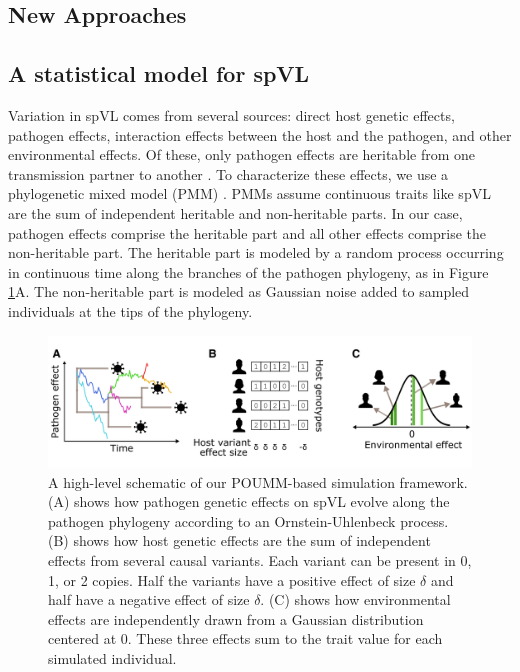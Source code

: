 \documentclass[11pt]{article}
\begin{document}
\begin{linenumbers}
\section*{New Approaches}
\subsection*{A statistical model for spVL}

Variation in spVL comes from several sources: direct host genetic effects, pathogen effects, interaction effects between the host and the pathogen, and other environmental effects. Of these, only pathogen effects are heritable from one transmission partner to another \citep{Leventhal2016}. To characterize these effects, we use a phylogenetic mixed model (PMM) \citep{Housworth2004}. PMMs assume continuous traits like spVL are the sum of independent heritable and non-heritable parts. In our case, pathogen effects comprise the heritable part and all other effects comprise the non-heritable part. The heritable part is modeled by a random process occurring in continuous time along the branches of the pathogen phylogeny, as in Figure \ref{fig:spVLModel}A. The non-heritable part is modeled as Gaussian noise added to sampled individuals at the tips of the phylogeny.

\begin{figure}[H]
	\begin{center}
	\includegraphics[width = \linewidth]{figures/simulation_setup.png}
	\caption{A high-level schematic of our POUMM-based simulation framework. (A) shows how pathogen genetic effects on spVL evolve along the pathogen phylogeny according to an Ornstein-Uhlenbeck process. (B) shows how host genetic effects are the sum of independent effects from several causal variants. Each variant can be present in 0, 1, or 2 copies. Half the variants have a positive effect of size $\delta$ and half have a negative effect of size $\delta$. (C) shows how environmental effects are independently drawn from a Gaussian distribution centered at 0. These three effects sum to the trait value for each simulated individual.}
		\label{fig:spVLModel}
	\end{center}
\end{figure}


\end{linenumbers}
\end{document}
